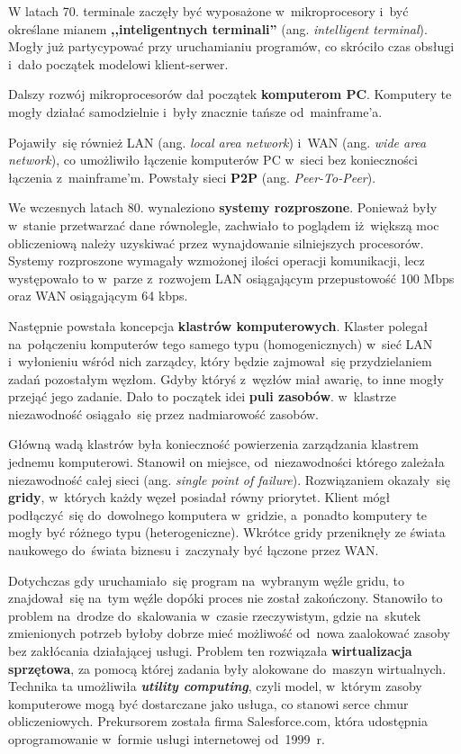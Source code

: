\documentclass[12pt,a4paper,twoside,titlepage,openright]{book}
\begin{document}
W latach 70. terminale zaczęły być wyposażone w~mikroprocesory i~być określane mianem \textbf{,,inteligentnych terminali''} (ang. \textit{intelligent terminal}). Mogły już partycypować przy uruchamianiu programów, co skróciło czas obsługi i~dało początek modelowi klient-serwer.

Dalszy rozwój mikroprocesorów dał początek \textbf{komputerom PC}. Komputery te mogły działać samodzielnie i~były znacznie tańsze od~mainframe'a.

Pojawiły~się również LAN (ang. \textit{local area network}) i~WAN (ang. \textit{wide area network}), co umożliwiło łączenie komputerów PC w~sieci bez konieczności łączenia z~mainframe'm. Powstały sieci \textbf{P2P} (ang. \textit{Peer-To-Peer}).

We wczesnych latach 80. wynaleziono \textbf{systemy rozproszone}. Ponieważ były w~stanie przetwarzać dane równolegle, zachwiało to poglądem iż~większą moc obliczeniową należy uzyskiwać przez wynajdowanie silniejszych procesorów. Systemy rozproszone wymagały wzmożonej ilości operacji komunikacji, lecz występowało to w~parze z~rozwojem LAN osiągającym przepustowość 100 Mbps oraz WAN osiągającym 64 kbps.

Następnie powstała koncepcja \textbf{klastrów komputerowych}. Klaster polegał na~połączeniu komputerów tego samego typu (homogenicznych) w~sieć LAN i~wyłonieniu wśród nich zarządcy, który będzie zajmował~się przydzielaniem zadań pozostałym węzłom. Gdyby któryś z~węzłów miał awarię, to inne mogły przejąć jego zadanie. Dało to początek idei \textbf{puli zasobów}. w~klastrze niezawodność osiągało~się przez nadmiarowość zasobów.

Główną wadą klastrów była konieczność powierzenia zarządzania klastrem jednemu komputerowi. Stanowił on miejsce, od~niezawodności którego zależała niezawodność całej sieci (ang. \textit{single point of failure}). Rozwiązaniem okazały~się \textbf{gridy}, w~których każdy węzeł posiadał równy priorytet. Klient mógł podłączyć~się do~dowolnego komputera w~gridzie, a~ponadto komputery te mogły być różnego typu (heterogeniczne). Wkrótce gridy przeniknęły ze świata naukowego do~świata biznesu i~zaczynały być łączone przez WAN.

Dotychczas gdy uruchamiało~się program na~wybranym węźle gridu, to znajdował~się na~tym węźle dopóki proces nie został zakończony. Stanowiło to problem na~drodze do~skalowania w~czasie rzeczywistym, gdzie na~skutek zmienionych potrzeb byłoby dobrze mieć możliwość od~nowa zaalokować zasoby bez zakłócania działającej usługi. Problem ten rozwiązała \textbf{wirtualizacja sprzętowa}, za pomocą której zadania były alokowane do~maszyn wirtualnych. Technika ta umożliwiła \textbf{\textit{utility computing}}, czyli model, w~którym zasoby komputerowe mogą być dostarczane jako usługa, co stanowi serce chmur obliczeniowych. Prekursorem została firma Salesforce.com, która udostępnia oprogramowanie w~formie usługi internetowej od~1999~r.
\end{document}
